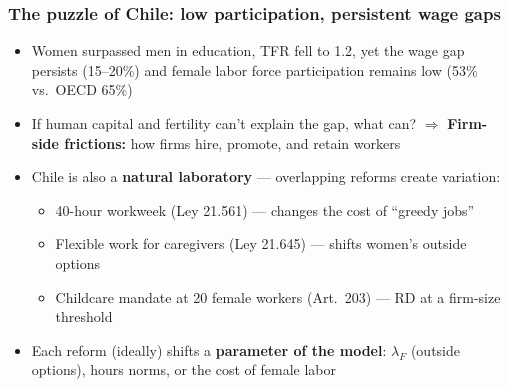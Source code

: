 \documentclass[aspectratio=169, 11pt]{beamer}
\begin{document}

\begin{frame}
\frametitle{The puzzle of Chile: low participation, persistent wage gaps}

\begin{itemize}
    \item Women surpassed men in education, TFR fell to 1.2, yet the wage gap persists (15--20\%) and female labor force participation remains low (53\% vs.\ OECD 65\%)

    \medskip
    \item If human capital and fertility can't explain the gap, what can? $\Rightarrow$ \textbf{Firm-side frictions:} how firms hire, promote, and retain workers

    \medskip
    \item Chile is also a \textbf{natural laboratory} --- overlapping reforms create variation:
    \begin{itemize}
        \item 40-hour workweek (Ley 21.561) --- changes the cost of ``greedy jobs''
        \item Flexible work for caregivers (Ley 21.645) --- shifts women's outside options
        \item Childcare mandate at 20 female workers (Art.\ 203) --- RD at a firm-size threshold
    \end{itemize}

    \medskip
    \item Each reform (ideally) shifts a \textbf{parameter of the model}: $\lambda_F$ (outside options), hours norms, or the cost of female labor 
\end{itemize}

\end{frame}
\end{document}
